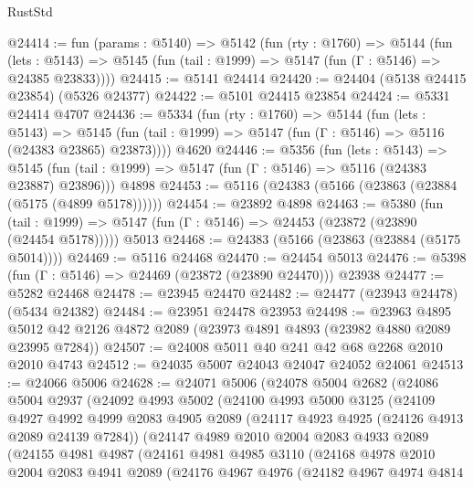 \begin{lexlean}{RustStd}
\begin{coremodule}
@24414 := fun (params : @5140) =>
  @5142
    (fun (rty : @1760) =>
    @5144
      (fun (lets : @5143) =>
      @5145 (fun (tail : @1999) => @5147 (fun (Γ : @5146) => @24385 @23833))))
@24415 := @5141 @24414
@24420 := @24404 (@5138 @24415 @23854) (@5326 @24377)
@24422 := @5101 @24415 @23854
@24424 := @5331 @24414 @4707
@24436 := @5334
    (fun (rty : @1760) =>
    @5144
      (fun (lets : @5143) =>
      @5145 (fun (tail : @1999) => @5147 (fun (Γ : @5146) => @5116 (@24383 @23865) @23873))))
    @4620
@24446 := @5356
    (fun (lets : @5143) =>
    @5145 (fun (tail : @1999) => @5147 (fun (Γ : @5146) => @5116 (@24383 @23887) @23896)))
    @4898
@24453 := @5116 (@24383 (@5166 (@23863 (@23884 (@5175 (@4899 @5178))))))
@24454 := @23892 @4898
@24463 := @5380
    (fun (tail : @1999) => @5147 (fun (Γ : @5146) => @24453 (@23872 (@23890 (@24454 @5178)))))
    @5013
@24468 := @24383 (@5166 (@23863 (@23884 (@5175 @5014))))
@24469 := @5116 @24468
@24470 := @24454 @5013
@24476 := @5398 (fun (Γ : @5146) => @24469 (@23872 (@23890 @24470))) @23938
@24477 := @5282 @24468
@24478 := @23945 @24470
@24482 := @24477 (@23943 @24478) (@5434 @24382)
@24484 := @23951 @24478 @23953
@24498 := @23963
    @4895
    @5012
    @42
    @2126
    @4872
    @2089
    (@23973 @4891 @4893 (@23982 @4880 @2089 @23995 @7284))
@24507 := @24008 @5011 @40 @241 @42 @68 @2268 @2010 @2010 @4743
@24512 := @24035 @5007 @24043 @24047 @24052 @24061
@24513 := @24066 @5006
@24628 := @24071
    @5006
    (@24078
      @5004
      @2682
      (@24086
        @5004
        @2937
        (@24092
          @4993
          @5002
          (@24100
            @4993
            @5000
            @3125
            (@24109
              @4927
              @4992
              @4999
              @2083
              @4905
              @2089
              (@24117 @4923 @4925 (@24126 @4913 @2089 @24139 @7284))
              (@24147
                @4989
                @2010
                @2004
                @2083
                @4933
                @2089
                (@24155
                  @4981
                  @4987
                  (@24161
                    @4981
                    @4985
                    @3110
                    (@24168
                      @4978
                      @2010
                      @2004
                      @2083
                      @4941
                      @2089
                      (@24176
                        @4967
                        @4976
                        (@24182
                          @4967
                          @4974
                          @4814

\end{coremodule}
\end{lexlean}
